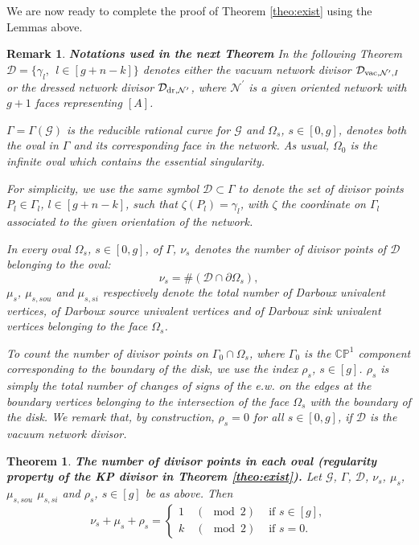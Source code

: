 \documentclass[11pt]{amsart}
\theoremstyle{plain}
\numberwithin{equation}{section}
\newtheorem{theorem}{Theorem}[subsection]
\newtheorem{remark}{Remark}[subsection]
\begin{document}
We are now ready to complete the proof of Theorem \ref{theo:exist} using the Lemmas above.

\begin{remark}\textbf{Notations used in the next Theorem}
In the following Theorem ${\mathcal D} = \{ \gamma_l, \,\; l\in [g+n-k]\}$ denotes either the vacuum network divisor ${\mathcal D}_{\textup{\scriptsize vac}, {\mathcal N}^{\prime}, I}$ or the dressed network divisor ${\mathcal D}_{\textup{\scriptsize dr}, {\mathcal N}^{\prime}}$, where ${\mathcal N}^{\prime}$ is a given oriented network with $g+1$ faces representing $[A]$. 

$\Gamma=\Gamma(\mathcal G)$ is the reducible rational curve for $\mathcal G$ and $\Omega_s$, $s\in[0,g]$, denotes both the oval in $\Gamma$ and its corresponding face in the network. As usual, $\Omega_0$ is the infinite oval which contains the essential singularity. 

For simplicity, we use the same symbol ${\mathcal D}\subset \Gamma $ to denote the set of divisor points $P_l \in \Gamma_l$, $l\in [g+n-k]$, such that $\zeta(P_l )= \gamma_l$, with $\zeta$ the coordinate on $\Gamma_l$ associated to the given orientation of the network. 

In every oval $\Omega_s$, $s\in [0,g]$, of $\Gamma$, $\nu_{s}$ denotes the number of divisor points of ${\mathcal D}$ belonging to the oval:
\[
\nu_s = \# ({\mathcal D}\cap \partial \Omega_s),
\]
$\mu_{s}$, $\mu_{s,sou}$ and $\mu_{s,si}$ respectively denote the total number of Darboux univalent vertices, of Darboux source univalent vertices and of Darboux sink univalent vertices belonging to the face $\Omega_s$. 

To count the number of divisor points on $\Gamma_0\cap \Omega_s$, where $\Gamma_0$ is the $\mathbb{CP}^1$ component corresponding to the boundary of the disk, we use the index $\rho_s$, $s\in [g]$.
$\rho_{s}$ is simply the total number of changes of signs of the e.w. on the edges at the boundary vertices belonging to the intersection of the face $\Omega_s$ with the boundary of the disk. We remark that, by construction, $\rho_s=0$ for all $s\in [0,g]$, if $\mathcal D$ is the vacuum network divisor. 
\end{remark}

\begin{theorem}\label{prop:comb_oval}\textbf{The number of divisor points in each oval (regularity property of the KP divisor in Theorem \ref{theo:exist}).}
Let $\mathcal G$, $\Gamma$, ${\mathcal D}$, $\nu_s$, $\mu_{s}$, $\mu_{s,sou}$ $\mu_{s,si}$ and $\rho_s$, $s\in [g]$ be as above. Then
\begin{equation}\label{eq:odd_N}
\nu_{s}+ \mu_{s} +\rho_s = \left\{ \begin{array}{ll} 1 \quad
(\!\!\!\!\!\!\mod 2) & \mbox{ if } s\in [g],\\
k \quad
(\!\!\!\!\!\!\mod 2) & \mbox{ if } s=0.
\end{array}
\right.
\end{equation}
\end{theorem}
\end{document}
